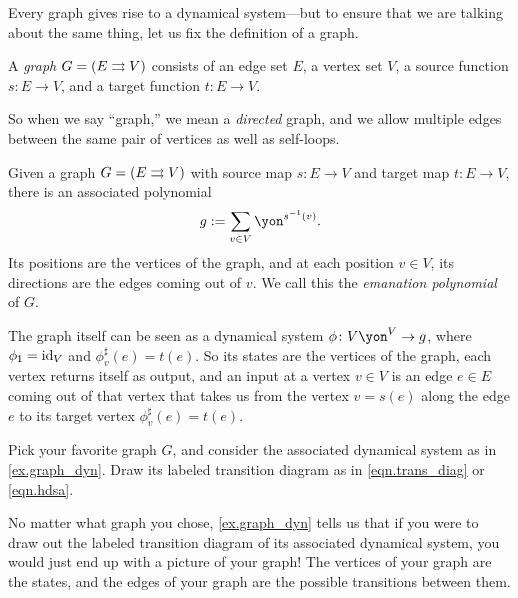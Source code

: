\documentclass[Book-Poly]{subfiles}
\begin{document}
Every graph gives rise to a dynamical system---but to ensure that we are talking about the same thing, let us fix the definition of a graph.

\begin{definition}[Graph] \label{def.graph}
A \emph{graph} $G = (E \rightrightarrows V)$ consists of an edge set $E$, a vertex set $V$, a source function $s\colon E\to V$, and a target function $t\colon E\to V$.
\end{definition}

So when we say ``graph,'' we mean a \emph{directed} graph, and we allow multiple edges between the same pair of vertices as well as self-loops.

\begin{example} \label{ex.graph_dyn}
Given a graph $G = (E \rightrightarrows V)$ with source map $s \colon E \to V$ and target map $t \colon E \to V$, there is an associated polynomial
\[
    g := \sum_{v \in V} \yon^{s\inv(v)}.
\]
Its positions are the vertices of the graph, and at each position $v\in V$, its directions are the edges coming out of $v$.
We call this the \emph{emanation polynomial} of $G$.

The graph itself can be seen as a dynamical system $\phi\colon V\yon^V \to g$, where $\phi_{\textsf{1}} = \mathrm{id}_V$ and $\phi^\sharp_v(e) = t(e)$.
So its states are the vertices of the graph, each vertex returns itself as output, and an input at a vertex $v\in V$ is an edge $e\in E$ coming out of that vertex that takes us from the vertex $v=s(e)$ along the edge $e$ to its target vertex $\phi^\sharp_v(e)=t(e)$.
\end{example}

\begin{exercise}
Pick your favorite graph $G$, and consider the associated dynamical system as in \cref{ex.graph_dyn}.
Draw its labeled transition diagram as in \eqref{eqn.trans_diag} or \eqref{eqn.hdsa}.
\begin{solution}
No matter what graph you chose, \cref{ex.graph_dyn} tells us that if you were to draw out the labeled transition diagram of its associated dynamical system, you would just end up with a picture of your graph!
The vertices of your graph are the states, and the edges of your graph are the possible transitions between them.
\end{solution}
\end{exercise}

\end{document}
